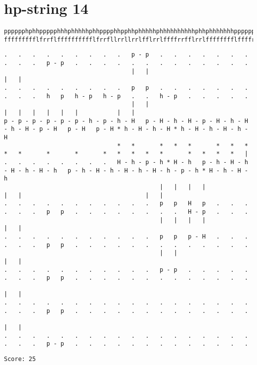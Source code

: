 \documentclass[a4paper,oneside,article,11pt]{memoir}
\begin{document}
\section*{hp-string 14}
\begin{lstlisting}[basicstyle=\fontsize{6}{11}\ttfamily]
pppppphphhppppphhhphhhhhphhpppphhpphhphhhhhphhhhhhhhhhphhphhhhhhhppppppppppphhhhhhhpphphhhpppppphphh
ffffffffflfrrflfffffffffflfrrfllrrllrrlfflrrlffffrrfflrrlfffffffflffffrrfffflfffffflfrrfllffrrfflff
\end{lstlisting}
\begin{lstlisting}[basicstyle=\fontsize{1}{11}\ttfamily]
.   .   .   .   .   .   .   .   .   p - p   .   .   .   .   .   .   .   .   .   .   p - p   .   .   .   .   .   .   .   .   .   .   .   .   .
                                    |   |                                           |   |
.   .   .   .   .   .   .   .   .   p   p   .   .   .   .   .   .   .   .   .   .   h   p   h - p   h - p   .   .   h - p   .   .   .   .   .
                                    |   |                                           |   |   |   |   |   |           |   |
p - p - p - p - p - p - h - p - h - H   p - H - h - H - p - H - h - H - h - H - p - H   p - H   p - H * h - H - h - H * h - H - h - H - h - H
                                *   *       *   *   *       *   *   *   *   *       *       *       *   *   *   *   *       *   *   *   *   |
.   .   .   .   .   .   .   .   H - h - p - h * H - h   p - h - H - h - H - h - H - h   p - h - H - h - H - h - H - h - p - h * H - h - H - h
                                            |   |   |   |                           |   |                                   |   |
.   .   .   .   .   .   .   .   .   .   .   p   p   H   p   .   .   .   .   .   .   p   p   .   .   .   .   .   .   .   .   H - p   .   .   .
                                            |   |   |   |                           |   |
.   .   .   .   .   .   .   .   .   .   .   p   p   p - H   .   .   .   .   .   .   p   p   .   .   .   .   .   .   .   .   .   .   .   .   .
                                            |   |                                   |   |
.   .   .   .   .   .   .   .   .   .   .   p - p   .   .   .   .   .   .   .   .   p   p   .   .   .   .   .   .   .   .   .   .   .   .   .
                                                                                    |   |
.   .   .   .   .   .   .   .   .   .   .   .   .   .   .   .   .   .   .   .   .   p   p   .   .   .   .   .   .   .   .   .   .   .   .   .
                                                                                    |   |
.   .   .   .   .   .   .   .   .   .   .   .   .   .   .   .   .   .   .   .   .   p - p   .   .   .   .   .   .   .   .   .   .   .   .   .

\end{lstlisting}
\begin{lstlisting}
Score: 25
\end{lstlisting}
\end{document}
